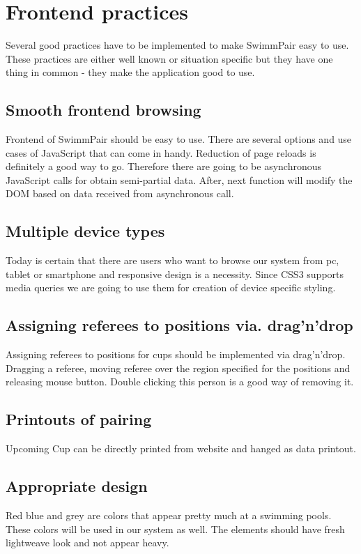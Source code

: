 \section{Frontend practices}
Several good practices have to be implemented to make SwimmPair easy to use. These practices are either well known or situation specific but they have one thing in common - they make the application good to use.
\subsection*{Smooth frontend browsing}
\par
Frontend of SwimmPair should be easy to use. There are several options and use cases of JavaScript that can come in handy. Reduction of page reloads is definitely a good way to go. Therefore there are going to be asynchronous JavaScript calls for obtain semi-partial data. After, next function will modify the DOM based on data received from asynchronous call. 
\subsection*{Multiple device types}
\par
Today is certain that there are users who want to browse our system from pc, tablet or smartphone and responsive design is a necessity. Since CSS3 supports media queries we are going to use them for creation of device specific styling.
\subsection*{Assigning referees to positions via. drag'n'drop}
\par
Assigning referees to positions for cups should be implemented via drag'n'drop. Dragging a referee, moving referee over the region specified for the positions and releasing mouse button. Double clicking this person is a good way of removing it.
\subsection*{Printouts of pairing}
Upcoming Cup can be directly printed from website and hanged as data printout. 
\subsection*{Appropriate design}
\par
Red blue and grey are colors that appear pretty much at a swimming pools. These colors will be used in our system as well. The elements should have fresh lightweave look and not appear heavy.
